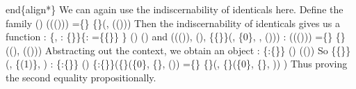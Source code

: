 end\{align*\}
We can again use the indiscernability of identicals here.  Define the family
  ()  ((())) =\coqdocvar{\_}\{\} \{\}(, (())) 
Then the indiscernability of identicals gives us a function
  : \{,  : \{\}\}\{: =\coqdocvar{\_}\{\{\}\} \} ()  ()
and
  ((()), (), \{\{\}\}(, \{0\}, , ()))
  :
  ((())) =\coqdocvar{\_}\{\} \{\}((), (()))
Abstracting out the context, we obtain an object
   : \{:\{\}\} ()  (())
So
  \{\{\}\}(, \{(1)\}, ) : \{:\{\}\} ()
  \{:\{\}\}(\{\}(\{0\}, \{\}, ()) =\coqdocvar{\_}\{\} \{\}(,
  \{\}(\{0\}, \{\}, )) )
Thus proving the second equality propositionally.


